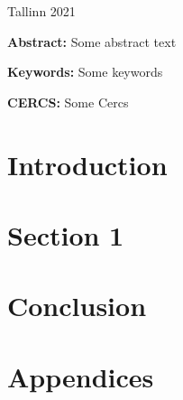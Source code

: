 \documentclass{src/style/main-style}
\begin{document}
\vfill
\centerline{Tallinn 2021}


\pagebreak
\listoftodos[Todos]

\pagebreak

\noindent\textbf{\large \articleName}
\vspace*{3ex}
\begin{flushleft}
  \textbf{Abstract:}
  Some abstract text

\end{flushleft}


\vspace*{3ex}
\begin{flushleft}
  \textbf{Keywords:} Some keywords
\end{flushleft}
\vspace*{3ex}

\noindent\textbf{CERCS:} Some Cercs

\newpage

\tableofcontents

\pagebreak


\section{Introduction}


\pagebreak

\section{Section 1}
\label{sec:section_1}


\clearpage
\section{Conclusion}



\newpage

{}


\newpage

\appendix
\section*{Appendices}
\renewcommand{\thesubsection}{\Alph{subsection}}

\end{document}
